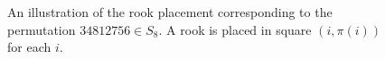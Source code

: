 \begin{figure}
  \center
  \caption[A permutation corresponding to a rook placement.]{
    An illustration of the rook placement corresponding to the permutation
    $34812756 \in S_8$. A rook is placed in square $(i, \pi(i))$ for each $i$.
  }
  \label{fig:permutationFromRooks}
\end{figure}
